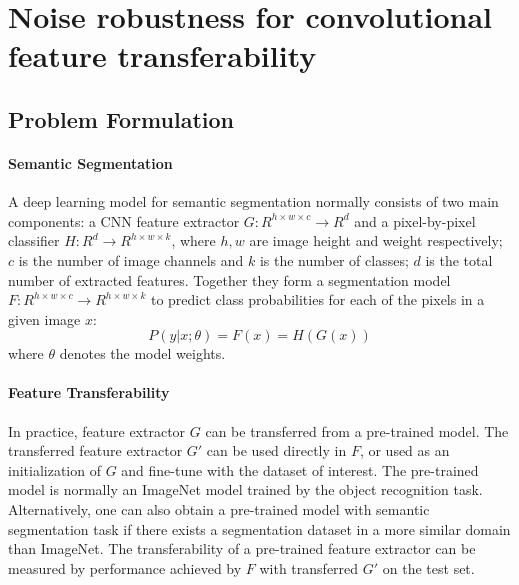 \section{Noise robustness for convolutional feature transferability}
\label{sec:robustness}


\subsection{Problem Formulation}
\label{subsec:formulation}

\paragraph{Semantic Segmentation}
\noindent \textit{}
A deep learning model for semantic segmentation normally consists of two main components: a CNN feature extractor $G: R^{h \times w \times c} \rightarrow R^{d}$ and a pixel-by-pixel classifier $H: R^{d} \rightarrow R^{h \times w \times k}$, where $h, w$ are image height and weight respectively; $c$ is the number of image channels and $k$ is the number of classes; $d$ is the total number of extracted features.
Together they form a segmentation model $F: R^{h \times w \times c} \rightarrow R^{h \times w \times k}$ to predict class probabilities for each of the pixels in a given image $x$:
$$P(y \vert x; \theta) = F(x) = H(G(x))$$
where $\theta$ denotes the model weights.

\paragraph{Feature Transferability}
In practice, feature extractor $G$ can be transferred from a pre-trained model.
The transferred feature extractor $G'$ can be used directly in $F$, or used as an initialization of $G$ and fine-tune with the dataset of interest.
The pre-trained model is normally an ImageNet model trained by the object recognition task.
Alternatively, one can also obtain a pre-trained model with semantic segmentation task if there exists a segmentation dataset in a more similar domain than ImageNet.
The transferability of a pre-trained feature extractor can be measured by performance achieved by $F$ with transferred $G'$ on the test set.


